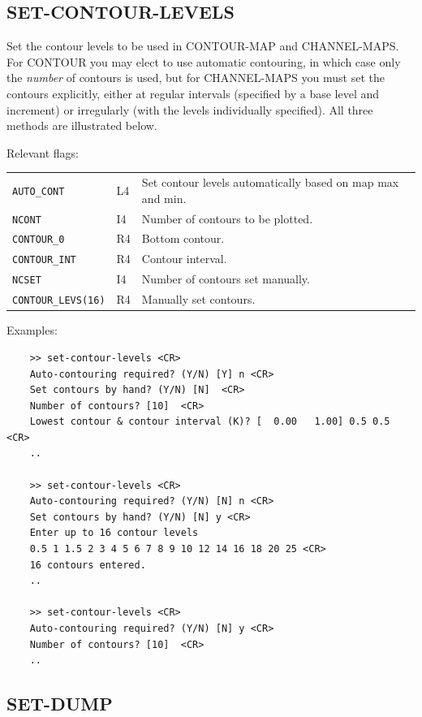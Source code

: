 \documentclass[11pt,twoside]{report}
\begin{document}
\subsection{SET-CONTOUR-LEVELS} 

Set the contour levels to be used in  CONTOUR-MAP and CHANNEL-MAPS.
 
For CONTOUR you may elect to use automatic contouring, in which case only
the {\em number} of contours is used, but for CHANNEL-MAPS you must set
the contours explicitly, either at regular intervals (specified by a base
level and increment) or irregularly (with the levels individually 
specified). All three methods are illustrated below.

Relevant flags:\\
\begin{tabular}{lll}
  \verb+AUTO_CONT+ & L4 & Set contour levels automatically based on map max
                          and min.\\
  \verb+NCONT+     & I4 & Number of contours to be plotted.\\
  \verb+CONTOUR_0+ & R4 & Bottom contour.\\
  \verb+CONTOUR_INT+ & R4 & Contour interval.\\
  \verb+NCSET+     & I4 & Number of contours set manually.\\
  \verb+CONTOUR_LEVS(16)+ & R4 & Manually set contours.
\end{tabular}

Examples:
\begin{verbatim}
    >> set-contour-levels <CR>
    Auto-contouring required? (Y/N) [Y] n <CR>
    Set contours by hand? (Y/N) [N]  <CR>
    Number of contours? [10]  <CR>
    Lowest contour & contour interval (K)? [  0.00   1.00] 0.5 0.5 <CR>
    ..

    >> set-contour-levels <CR>
    Auto-contouring required? (Y/N) [N] n <CR>
    Set contours by hand? (Y/N) [N] y <CR>
    Enter up to 16 contour levels
    0.5 1 1.5 2 3 4 5 6 7 8 9 10 12 14 16 18 20 25 <CR>
    16 contours entered.
    ..

    >> set-contour-levels <CR>
    Auto-contouring required? (Y/N) [N] y <CR>
    Number of contours? [10]  <CR>
    ..
\end{verbatim}

\subsection{SET-DUMP} 
\end{document}
